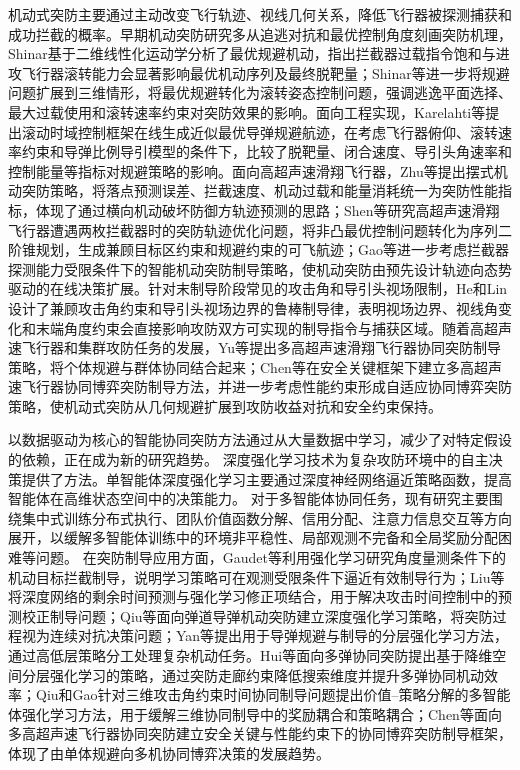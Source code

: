 机动式突防主要通过主动改变飞行轨迹、视线几何关系，降低飞行器被探测捕获和成功拦截的概率。早期机动突防研究多从追逃对抗和最优控制角度刻画突防机理，Shinar\cite{Shinar1977JA}基于二维线性化运动学分析了最优规避机动，指出拦截器过载指令饱和与进攻飞行器滚转能力会显著影响最优机动序列及最终脱靶量；Shinar等\cite{Shinar1979JGC}进一步将规避问题扩展到三维情形，将最优规避转化为滚转姿态控制问题，强调逃逸平面选择、最大过载使用和滚转速率约束对突防效果的影响。面向工程实现，Karelahti等\cite{Karelahti2007JGCD}提出滚动时域控制框架在线生成近似最优导弹规避航迹，在考虑飞行器俯仰、滚转速率约束和导弹比例导引模型的条件下，比较了脱靶量、闭合速度、导引头角速率和控制能量等指标对规避策略的影响。面向高超声速滑翔飞行器，Zhu等\cite{Zhu2018AST}提出摆式机动突防策略，将落点预测误差、拦截速度、机动过载和能量消耗统一为突防性能指标，体现了通过横向机动破坏防御方轨迹预测的思路；Shen等\cite{Shen2022AST}研究高超声速滑翔飞行器遭遇两枚拦截器时的突防轨迹优化问题，将非凸最优控制问题转化为序列二阶锥规划，生成兼顾目标区约束和规避约束的可飞航迹；Gao等\cite{Gao2025AAS}进一步考虑拦截器探测能力受限条件下的智能机动突防制导策略，使机动突防由预先设计轨迹向态势驱动的在线决策扩展。针对末制导阶段常见的攻击角和导引头视场限制，He和Lin\cite{He2015FOV}设计了兼顾攻击角约束和导引头视场边界的鲁棒制导律，表明视场边界、视线角变化和末端角度约束会直接影响攻防双方可实现的制导指令与捕获区域。随着高超声速飞行器和集群攻防任务的发展，Yu等\cite{Yu2020CJA}提出多高超声速滑翔飞行器协同突防制导策略，将个体规避与群体协同结合起来；Chen等\cite{Chen2024CJA}在安全关键框架下建立多高超声速飞行器协同博弈突防制导方法，并进一步考虑性能约束形成自适应协同博弈突防策略\cite{Chen2024TAES}，使机动式突防从几何规避扩展到攻防收益对抗和安全约束保持。


以数据驱动为核心的智能协同突防方法通过从大量数据中学习，减少了对特定假设的依赖，正在成为新的研究趋势。
深度强化学习技术为复杂攻防环境中的自主决策提供了方法。单智能体深度强化学习主要通过深度神经网络逼近策略函数，提高智能体在高维状态空间中的决策能力\cite{Mnih2015Nature,Schulman2017PPO}。
对于多智能体协同任务，现有研究主要围绕集中式训练分布式执行\cite{Lowe2017MADDPG,Yu2022MAPPO}、团队价值函数分解\cite{Sunehag2018VDN,Rashid2020JMLR}、信用分配\cite{Foerster2018COMA}、注意力信息交互\cite{Iqbal2019MAAC}等方向展开，以缓解多智能体训练中的环境非平稳性、局部观测不完备和全局奖励分配困难等问题。
在突防制导应用方面，Gaudet等\cite{Gaudet2020AST}利用强化学习研究角度量测条件下的机动目标拦截制导，说明学习策略可在观测受限条件下逼近有效制导行为；Liu等\cite{Liu2021AST}将深度网络的剩余时间预测与强化学习修正项结合，用于解决攻击时间控制中的预测校正制导问题；Qiu等\cite{Qiu2022JAE}面向弹道导弹机动突防建立深度强化学习策略，将突防过程视为连续对抗决策问题；Yan等\cite{Yan2022SciRep}提出用于导弹规避与制导的分层强化学习方法，通过高低层策略分工处理复杂机动任务。Hui等\cite{Hui2025CJA}面向多弹协同突防提出基于降维空间分层强化学习的策略，通过突防走廊约束降低搜索维度并提升多弹协同机动效率；Qiu和Gao\cite{Qiu2024AST}针对三维攻击角约束时间协同制导问题提出价值--策略分解的多智能体强化学习方法，用于缓解三维协同制导中的奖励耦合和策略耦合；Chen等\cite{Chen2024CJA,Chen2024TAES}面向多高超声速飞行器协同突防建立安全关键与性能约束下的协同博弈突防制导框架，体现了由单体规避向多机协同博弈决策的发展趋势。


